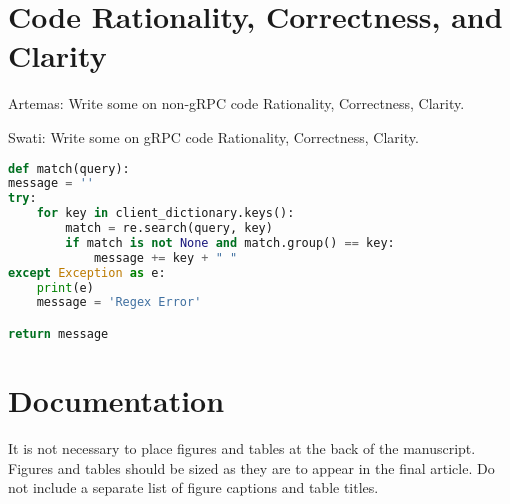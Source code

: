 \documentclass[9pt,twocolumn,twoside]{osajnl}
\begin{document}








\section{Code Rationality, Correctness, and Clarity}
\label{sec:examples}
Artemas: Write some on non-gRPC code Rationality, Correctness, Clarity.

\bigskip

\noindent Swati: Write some on gRPC code Rationality, Correctness, Clarity.

\begin{lstlisting}[language=python,caption={use code samples like this}]
def match(query):
message = ''
try:
    for key in client_dictionary.keys():
        match = re.search(query, key)
        if match is not None and match.group() == key:
            message += key + " "
except Exception as e:
    print(e)
    message = 'Regex Error'

return message
\end{lstlisting}

\section{Documentation}

It is not necessary to place figures and tables at the back of the manuscript. Figures and tables should be sized as they are to appear in the final article. Do not include a separate list of figure captions and table titles.


  
\end{document}
